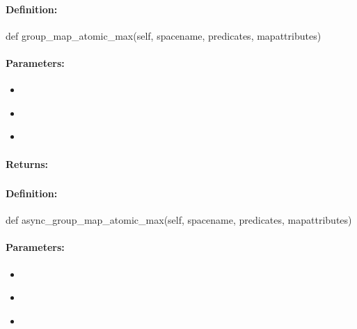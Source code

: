 \paragraph{Definition:}
\begin{pythoncode}
def group_map_atomic_max(self, spacename, predicates, mapattributes)
\end{pythoncode}

\paragraph{Parameters:}
\begin{itemize}[noitemsep]
\item {}\\

\item {}\\

\item {}\\

\end{itemize}

\paragraph{Returns:}


\pagebreak
\subsubsection{}
\label{api:python:async_group_map_atomic_max}


\paragraph{Definition:}
\begin{pythoncode}
def async_group_map_atomic_max(self, spacename, predicates, mapattributes)
\end{pythoncode}

\paragraph{Parameters:}
\begin{itemize}[noitemsep]
\item {}\\

\item {}\\

\item {}\\

\end{itemize}

